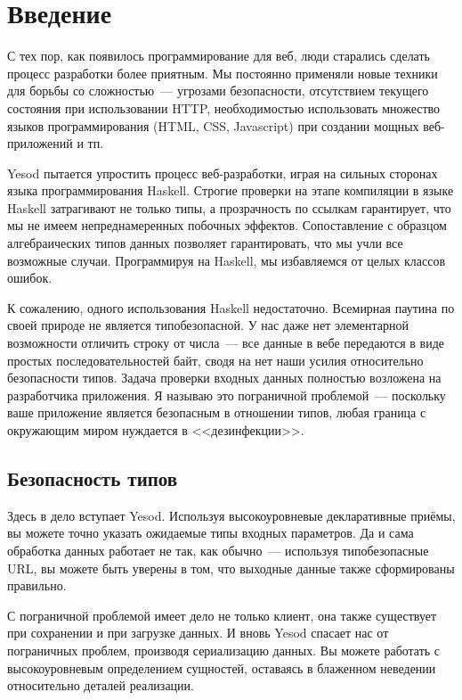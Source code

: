 \chapter{Введение}\label{chap:introduction}

С тех пор, как появилось программирование для веб, люди старались сделать
процесс разработки более приятным. Мы постоянно применяли новые техники для
борьбы со сложностью~--- угрозами безопасности, отсутствием текущего состояния
при использовании HTTP, необходимостью использовать множество языков
программирования (HTML, CSS, Javascript) при создании мощных веб-приложений и
тп.

Yesod пытается упростить процесс веб-разработки, играя на сильных сторонах
языка программирования Haskell. Строгие проверки на этапе компиляции в языке
Haskell затрагивают не только типы, а прозрачность по ссылкам гарантирует, что
мы не имеем непреднамеренных побочных эффектов. Сопоставление с образцом
алгебраических типов данных позволяет гарантировать, что мы учли все возможные
случаи. Программируя на Haskell, мы избавляемся от целых классов ошибок.

К сожалению, одного использования Haskell недостаточно. Всемирная паутина по
своей природе не является типобезопасной. У нас даже нет элементарной
возможности отличить строку от числа~--- все данные в вебе передаются в виде
простых последовательностей байт, сводя на нет наши усилия относительно
безопасности типов. Задача проверки входных данных полностью возложена на
разработчика приложения. Я называю это пограничной проблемой~--- поскольку ваше
приложение является безопасным в отношении типов, любая граница с окружающим
миром нуждается в <<дезинфекции>>.

\section{Безопасность типов}

Здесь в дело вступает Yesod. Используя высокоуровневые декларативные приёмы, вы
можете точно указать ожидаемые типы входных параметров. Да и сама обработка
данных работает не так, как обычно~--- используя типобезопасные URL, вы можете
быть уверены в том, что выходные данные также сформированы правильно.

С пограничной проблемой имеет дело не только клиент, она также существует при
сохранении и при загрузке данных. И вновь Yesod спасает нас от пограничных
проблем, производя сериализацию данных. Вы можете работать с высокоуровневым
определением сущностей, оставаясь в блаженном неведении относительно деталей
реализации.

